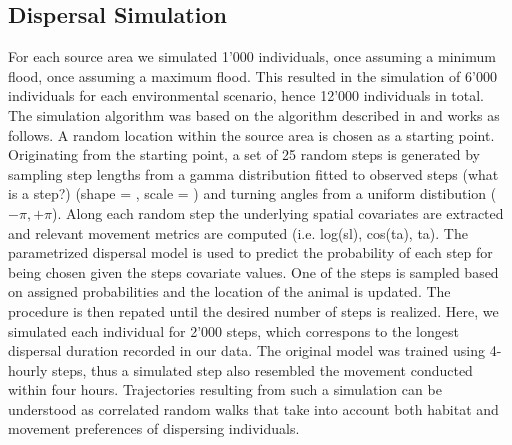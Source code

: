 \documentclass[abstract=on,10pt,a4paper,bibliography=totocnumbered]{article}
\begin{document}
\subsection{Dispersal Simulation}
For each source area we simulated 1'000 individuals, once assuming a minimum
flood, once assuming a maximum flood. This resulted in the simulation of 6'000
individuals for each environmental scenario, hence 12'000 individuals in total.
The simulation algorithm was based on the algorithm described in
 and works as follows. A random location within the source
area is chosen as a starting point. Originating from the starting point, a set
of 25 random steps is generated by sampling step lengths from a gamma
distribution fitted to observed steps (what is a step?) (shape = , scale = ) and
turning angles from a uniform distibution ($-\pi, +\pi$). Along each random step
the underlying spatial covariates are extracted and relevant movement metrics
are computed (i.e. log(sl), cos(ta), ta). The parametrized dispersal model is
used to predict the probability of each step for being chosen given the steps
covariate values. One of the steps is sampled based on assigned probabilities
and the location of the animal is updated. The procedure is then repated until
the desired number of steps is realized. Here, we simulated each individual for
2'000 steps, which correspons to the longest dispersal duration recorded in our
data. The original model was trained using 4-hourly steps, thus a simulated step
also resembled the movement conducted within four hours. Trajectories resulting
from such a simulation can be understood as correlated random walks that take
into account both habitat and movement preferences of dispersing individuals.

%
\end{document}
